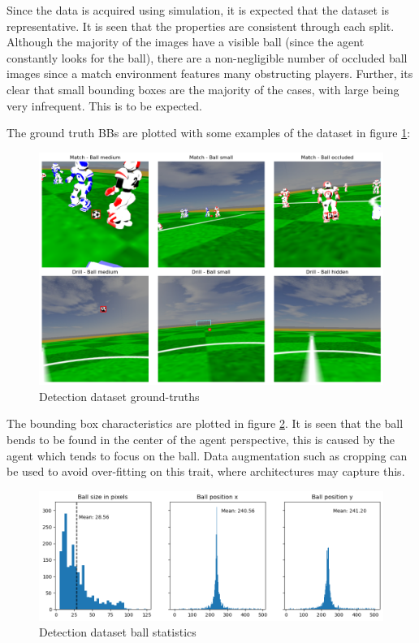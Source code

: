 \documentclass[a4paper,twoside,12pt]{report}
\begin{document}
Since the data is acquired using simulation, it is expected that the dataset is representative. It is seen that the properties are consistent through each split. Although the majority of the images have a visible ball (since the agent constantly looks for the ball), there are a non-negligible number of occluded ball images since a match environment features many obstructing players. Further, its clear that small bounding boxes are the majority of the cases, with large being very infrequent. This is to be expected.

The ground truth BBs are plotted with some examples of the dataset in figure \ref{fig:detectimages}:

\begin{figure}[h!]
\begin{center}
\includegraphics[width=16cm]{images/imagedetections.png}
\caption{Detection dataset ground-truths}
\label{fig:detectimages}
\end{center}
\end{figure}

The bounding box characteristics are plotted in figure \ref{fig:detectplot}. It is seen that the ball bends to be found in the center of the agent perspective, this is caused by the agent which tends to focus on the ball. Data augmentation such as cropping can be used to avoid over-fitting on this trait, where architectures may capture this.

\begin{figure}[h!]
\begin{center}
\includegraphics[width=15cm]{images/plotdetections.png}
\caption{Detection dataset ball statistics}
\label{fig:detectplot}
\end{center}
\end{figure}
\end{document}
